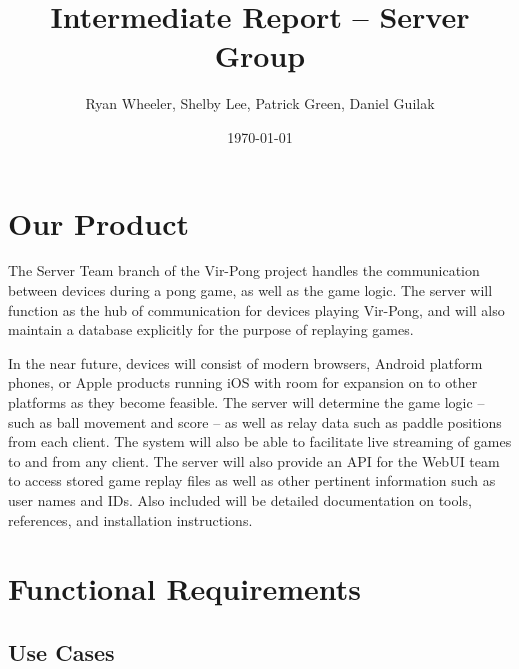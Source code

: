 \documentclass[letterpaper,12pt]{article}
\begin{document}
\title{Intermediate Report -- Server Group}
\author{Ryan Wheeler, Shelby Lee, Patrick Green, Daniel Guilak}
\date{\today}
\maketitle
\newpage

\tableofcontents

\section{Our Product}
The Server Team branch of the Vir-Pong project handles the communication between devices during a pong game, as well as the game logic. The server will function as the hub of communication for devices playing Vir-Pong, and will also maintain a database explicitly for the purpose of replaying games.

In the near future, devices will consist of modern browsers, Android platform phones, or Apple products running iOS with room for expansion on to other platforms as they become feasible. The server will determine the game logic -- such as ball movement and score -- as well as relay data such as paddle positions from each client. The system will also be able to facilitate live streaming of games to and from any client. The server will also provide an API for the WebUI team to access stored game replay files as well as other pertinent information such as user names and IDs. Also included will be detailed documentation on tools, references, and installation instructions.

\section{Functional Requirements}

\subsection{Use Cases}
\end{document}
